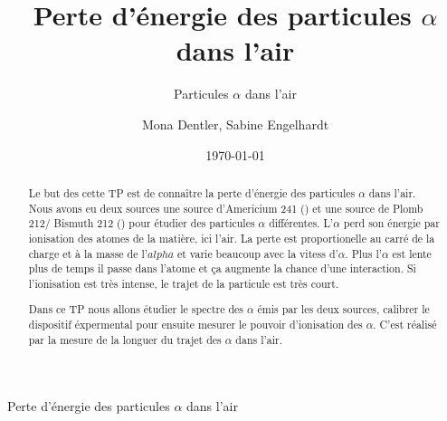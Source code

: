 \documentclass[a4paper,11pt,liststotocnumbered,bibtotocnumbered]{scrartcl}
\title{Perte d'énergie des particules $\alpha$ dans l'air}
\subtitle{Particules $\alpha$ dans l'air}
\author{Mona Dentler, Sabine Engelhardt}
\date{\today}
\begin{document}
 \nocite{poly}
 \pagestyle{empty}
 \begin{center}
  \makeatletter
  \@subject
  \vspace{2cm}

  \Huge
  Perte d'énergie des particules $\alpha$ dans l'air\newline
  \vspace{1cm}
  \Large


  \@author
  \newline
  \@publishers


  \@date
  \makeatother
 \end{center}
 \vfill

 \begin{abstract}
  Le but des cette TP est de connaître la perte d'énergie des particules $\alpha$ dans l'air. Nous avons eu deux sources une source d'Americium 241 () et une source de Plomb 212/ Bismuth 212 () pour étudier des particules $\alpha$ différentes. L'$\alpha$ perd son énergie par ionisation des atomes de la matière, ici l'air. La perte est proportionelle au carré de la charge et à la masse de l'$alpha$ et varie beaucoup avec la vitess d'$\alpha$. Plus l'$\alpha$ est lente plus de temps il passe dans l'atome et \c ca augmente la chance d'une interaction. Si l'ionisation est très intense, le trajet de la particule est très court.

  Dans ce TP nous allons étudier le spectre des $\alpha$ émis par les deux sources, calibrer le dispositif éxpermental pour ensuite mesurer le pouvoir d'ionisation des $\alpha$. C'est réalisé par la mesure de la longuer du trajet des $\alpha$ dans l'air.
 \end{abstract}
\newpage
 \pagestyle{scrheadings}
 \tableofcontents
\newpage
\end{document}
